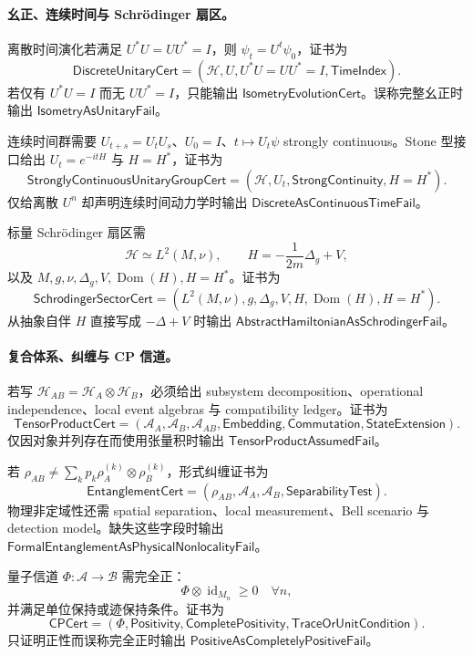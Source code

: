 \paragraph{幺正、连续时间与 Schr\"odinger 扇区。}
离散时间演化若满足 \(U^*U=UU^*=I\)，则 \(\psi_t=U^t\psi_0\)，证书为
\[
\boxed{\mathsf{DiscreteUnitaryCert}=(\mathcal H,U,U^*U=UU^*=I,\mathsf{TimeIndex}).}
\]
若仅有 \(U^*U=I\) 而无 \(UU^*=I\)，只能输出 \(\mathsf{IsometryEvolutionCert}\)。误称完整幺正时输出 \(\mathsf{IsometryAsUnitaryFail}\)。

连续时间群需要 \(U_{t+s}=U_tU_s\)、\(U_0=I\)、\(t\mapsto U_t\psi\) strongly continuous。Stone 型接口给出 \(U_t=e^{-itH}\) 与 \(H=H^*\)，证书为
\[
\boxed{\mathsf{StronglyContinuousUnitaryGroupCert}=(\mathcal H,U_t,\mathsf{StrongContinuity},H=H^*).}
\]
仅给离散 \(U^n\) 却声明连续时间动力学时输出 \(\mathsf{DiscreteAsContinuousTimeFail}\)。

标量 Schr\"odinger 扇区需
\[
\mathcal H\simeq L^2(M,\nu),\qquad H=-\frac{1}{2m}\Delta_g+V,
\]
以及 \(M,g,\nu,\Delta_g,V,\operatorname{Dom}(H),H=H^*\)。证书为
\[
\boxed{\mathsf{SchrodingerSectorCert}=(L^2(M,\nu),g,\Delta_g,V,H,\operatorname{Dom}(H),H=H^*).}
\]
从抽象自伴 \(H\) 直接写成 \(-\Delta+V\) 时输出 \(\mathsf{AbstractHamiltonianAsSchrodingerFail}\)。

\paragraph{复合体系、纠缠与 CP 信道。}
若写 \(\mathcal H_{AB}=\mathcal H_A\otimes\mathcal H_B\)，必须给出 subsystem decomposition、operational independence、local event algebras 与 compatibility ledger。证书为
\[
\boxed{\mathsf{TensorProductCert}=(\mathcal A_A,\mathcal A_B,\mathcal A_{AB},\mathsf{Embedding},\mathsf{Commutation},\mathsf{StateExtension}).}
\]
仅因对象并列存在而使用张量积时输出 \(\mathsf{TensorProductAssumedFail}\)。

若 \(\rho_{AB}\ne\sum_kp_k\rho_A^{(k)}\otimes\rho_B^{(k)}\)，形式纠缠证书为
\[
\boxed{\mathsf{EntanglementCert}=(\rho_{AB},\mathcal A_A,\mathcal A_B,\mathsf{SeparabilityTest}).}
\]
物理非定域性还需 spatial separation、local measurement、Bell scenario 与 detection model。缺失这些字段时输出 \(\mathsf{FormalEntanglementAsPhysicalNonlocalityFail}\)。

量子信道 \(\Phi:\mathcal A\to\mathcal B\) 需完全正：
\[
\Phi\otimes\operatorname{id}_{M_n}\ge0\quad\forall n,
\]
并满足单位保持或迹保持条件。证书为
\[
\boxed{\mathsf{CPCert}=(\Phi,\mathsf{Positivity},\mathsf{CompletePositivity},\mathsf{TraceOrUnitCondition}).}
\]
只证明正性而误称完全正时输出 \(\mathsf{PositiveAsCompletelyPositiveFail}\)。

